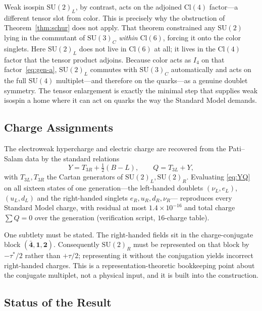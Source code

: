 \documentclass[12pt]{article}
\theoremstyle{remark}
\newcommand{\cl}{\mathrm{Cl}}
\newcommand{\su}{\mathrm{SU}}
\newcommand{\half}{\tfrac{1}{2}}
\begin{document}
Weak isospin $\su(2)_L$, by contrast, acts on the adjoined $\cl(4)$ factor---a
different tensor slot from color.  This is precisely why the obstruction of
Theorem~\ref{thm:schur} does not apply.  That theorem constrained any $\su(2)$
lying in the commutant of $\su(3)_C$ \emph{within} $\cl(6)$, forcing it onto the
color singlets.  Here $\su(2)_L$ does not live in $\cl(6)$ at all; it lives in
the $\cl(4)$ factor that the tensor product adjoins.  Because color acts as
$I_4$ on that factor~\eqref{eq:gen-a}, $\su(2)_L$ commutes with $\su(3)_C$
automatically and acts on the full $\su(4)$ multiplet---and therefore on the
quarks---as a genuine doublet symmetry.  The tensor enlargement is exactly the
minimal step that supplies weak isospin a home where it can act on quarks the
way the Standard Model demands.

\subsection{Charge Assignments}
\label{sec:charges}

The electroweak hypercharge and electric charge are recovered from the
Pati--Salam data by the standard relations
\begin{equation}
	Y = T_{3R} + \half(B-L),
	\qquad
	Q = T_{3L} + Y,
	\label{eq:YQ}
\end{equation}
with $T_{3L},T_{3R}$ the Cartan generators of $\su(2)_L,\su(2)_R$.  Evaluating
\eqref{eq:YQ} on all sixteen states of one generation---the left-handed doublets
$(\nu_L,e_L)$, $(u_L,d_L)$ and the right-handed singlets $e_R,u_R,d_R,\nu_R$---
reproduces every Standard Model charge, with residual at most
$1.4\times10^{-16}$ and total charge $\sum Q=0$ over the generation (verification
script, $16$-charge table).

One subtlety must be stated.  The right-handed fields sit in the
charge-conjugate block $(\bar{\mathbf{4}},\mathbf{1},\mathbf{2})$.  Consequently
$\su(2)_R$ must be represented on that block by $-\tau^*/2$ rather than
$+\tau/2$; representing it without the conjugation yields incorrect right-handed
charges.  This is a representation-theoretic bookkeeping point about the
conjugate multiplet, not a physical input, and it is built into the
construction.

\subsection{Status of the Result}
\label{sec:cl10-status}
\end{document}
